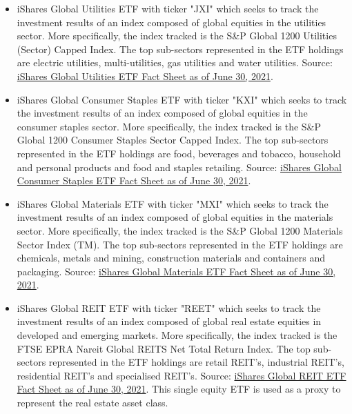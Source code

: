 \begin{itemize}
    \item iShares Global Utilities ETF with ticker "JXI" which seeks to track the investment results of an index composed of global equities in the utilities sector. More specifically, the index tracked is the S{\&}P Global 1200 Utilities (Sector) Capped Index. The top sub-sectors represented in the ETF holdings are electric utilities, multi-utilities, gas utilities and water utilities. Source: \href{https://www.ishares.com/us/literature/fact-sheet/jxi-ishares-global-utilities-etf-fund-fact-sheet-en-us.pdf}{iShares Global Utilities ETF Fact Sheet as of June 30, 2021}.%
    
    \item iShares Global Consumer Staples ETF with ticker "KXI" which seeks to track the investment results of an index composed of global equities in the consumer staples sector. More specifically, the index tracked is the S{\&}P Global 1200 Consumer Staples Sector Capped Index. The top sub-sectors represented in the ETF holdings are food, beverages and tobacco, household and personal products and food and staples retailing. Source: \href{https://www.ishares.com/us/literature/fact-sheet/kxi-ishares-global-consumer-staples-etf-fund-fact-sheet-en-us.pdf}{iShares Global Consumer Staples ETF Fact Sheet as of June 30, 2021}.%
    
    \item iShares Global Materials ETF with ticker "MXI" which seeks to track the investment results of an index composed of global equities in the materials sector. More specifically, the index tracked is the S{\&}P Global 1200 Materials Sector Index (TM). The top sub-sectors represented in the ETF holdings are chemicals, metals and mining, construction materials and containers and packaging. Source: \href{https://www.ishares.com/us/literature/fact-sheet/mxi-ishares-global-materials-etf-fund-fact-sheet-en-us.pdf}{iShares Global Materials ETF Fact Sheet as of June 30, 2021}.%
   
    \item iShares Global REIT ETF with ticker "REET" which seeks to track the investment results of an index composed of global real estate equities in developed and emerging markets. More specifically, the index tracked is the FTSE EPRA Nareit Global REITS Net Total Return Index. The top sub-sectors represented in the ETF holdings are retail REIT's, industrial REIT's, residential REIT's and specialised REIT's. Source: \href{https://www.ishares.com/us/literature/fact-sheet/reet-ishares-global-reit-etf-fund-fact-sheet-en-us.pdf}{iShares Global REIT ETF Fact Sheet as of June 30, 2021}. This single equity ETF is used as a proxy to represent the real estate asset class.%
    

\end{itemize}
